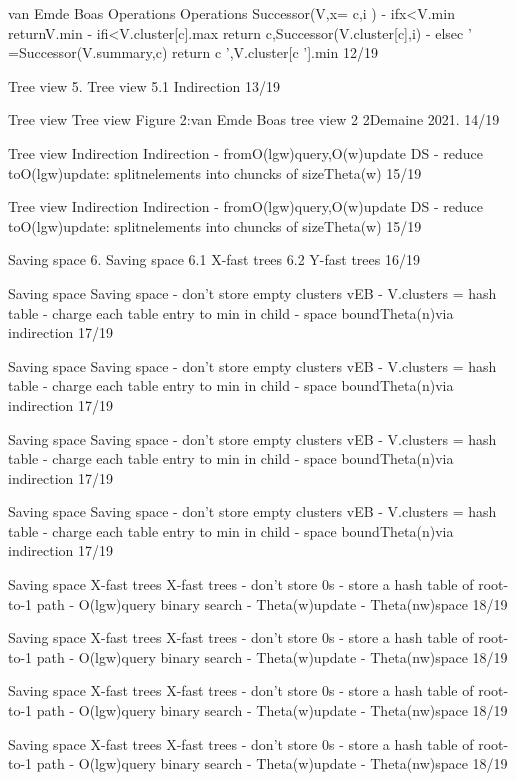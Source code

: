 \begin{description}[leftmargin=!,labelwidth=4.2em,style=nextline]
\item[Pag. 26] van Emde Boas Operations Operations Successor(V,x= c,i ) - ifx<V.min returnV.min - ifi<V.cluster[c].max return c,Successor(V.cluster[c],i) - elsec ' =Successor(V.summary,c) return c ',V.cluster[c '].min 12/19
\item[Pag. 27] Tree view 5. Tree view 5.1 Indirection 13/19
\item[Pag. 28] Tree view Tree view Figure 2:van Emde Boas tree view 2 2Demaine 2021. 14/19
\item[Pag. 29] Tree view Indirection Indirection - fromO(lgw)query,O(w)update DS - reduce toO(lgw)update: splitnelements into chuncks of sizeTheta(w) 15/19
\item[Pag. 30] Tree view Indirection Indirection - fromO(lgw)query,O(w)update DS - reduce toO(lgw)update: splitnelements into chuncks of sizeTheta(w) 15/19
\item[Pag. 31] Saving space 6. Saving space 6.1 X-fast trees 6.2 Y-fast trees 16/19
\item[Pag. 32] Saving space Saving space - don't store empty clusters vEB - V.clusters = hash table - charge each table entry to min in child - space boundTheta(n)via indirection 17/19
\item[Pag. 33] Saving space Saving space - don't store empty clusters vEB - V.clusters = hash table - charge each table entry to min in child - space boundTheta(n)via indirection 17/19
\item[Pag. 34] Saving space Saving space - don't store empty clusters vEB - V.clusters = hash table - charge each table entry to min in child - space boundTheta(n)via indirection 17/19
\item[Pag. 35] Saving space Saving space - don't store empty clusters vEB - V.clusters = hash table - charge each table entry to min in child - space boundTheta(n)via indirection 17/19
\item[Pag. 36] Saving space X-fast trees X-fast trees - don't store 0s - store a hash table of root-to-1 path - O(lgw)query binary search - Theta(w)update - Theta(nw)space 18/19
\item[Pag. 37] Saving space X-fast trees X-fast trees - don't store 0s - store a hash table of root-to-1 path - O(lgw)query binary search - Theta(w)update - Theta(nw)space 18/19
\item[Pag. 38] Saving space X-fast trees X-fast trees - don't store 0s - store a hash table of root-to-1 path - O(lgw)query binary search - Theta(w)update - Theta(nw)space 18/19
\item[Pag. 39] Saving space X-fast trees X-fast trees - don't store 0s - store a hash table of root-to-1 path - O(lgw)query binary search - Theta(w)update - Theta(nw)space 18/19

\end{description}
